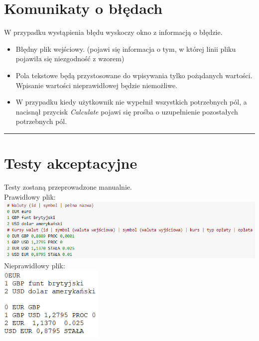 \documentclass[a4paper,11pt]{article}
\newcommand{\linia}{\rule{\linewidth}{0.4mm}}
\begin{document}
\section{Komunikaty o błędach}
W przypadku wystąpienia błędu wyskoczy okno z informacją o błędzie.
\begin{itemize}
\item Błędny plik wejściowy. (pojawi się informacja o tym, w której linii pliku pojawiła się niezgodność z wzorem)
\item Pola tekstowe będą przystosowane do wpisywania tylko pożądanych wartości. Wpisanie wartości nieprawidłowej będzie niemożliwe.
\item W przypadku kiedy użytkownik nie wypełnił wszystkich potrzebnych pól, a nacisnął przycisk \textit{Calculate} pojawi się prośba o uzupełnienie pozostałych potrzebnych pól.
\end{itemize}

\noindent\linia
\section{Testy akceptacyjne}
Testy zostaną przeprowadzone manualnie.
\\
Prawidłowy plik:
\\
\includegraphics[width= 16cm]{FileFormat}
\\
Nieprawidłowy plik:
\\
\includegraphics[width= 5cm]{FaultyFileFormat}
\end{document}
